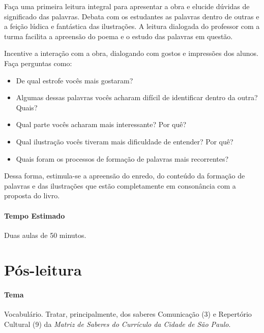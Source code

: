 \documentclass[11pt]{extarticle}
\begin{document}
Faça uma primeira leitura integral para apresentar a obra e elucide dúvidas de significado das palavras. Debata com os estudantes as palavras dentro de outras e a feição lúdica e fantástica das ilustrações. A leitura dialogada do professor com a turma facilita a apreensão do poema e o estudo das palavras em questão.

Incentive a interação com a obra, dialogando com gostos e impressões dos alunos. Faça perguntas como:

\begin{itemize}
\item De qual estrofe vocês mais gostaram?
\item Algumas dessas palavras vocês acharam difícil de identificar dentro da outra? Quais?
\item Qual parte vocês acharam mais interessante? Por quê?
\item Qual ilustração vocês tiveram mais dificuldade de entender? Por quê?
\item Quais foram os processos de formação de palavras mais recorrentes?
\end{itemize}

Dessa forma, estimula-se a apreensão do enredo, do conteúdo da formação de palavras e das ilustrações que estão completamente em consonância com a proposta do livro.

\paragraph{Tempo Estimado} Duas aulas de 50 minutos. 

\section{Pós-leitura}


\paragraph{Tema} Vocabulário. Tratar, principalmente, dos saberes Comunicação (3) e Repertório Cultural (9) da \textit{Matriz de Saberes do Currículo da Cidade de São Paulo}.
\end{document}
